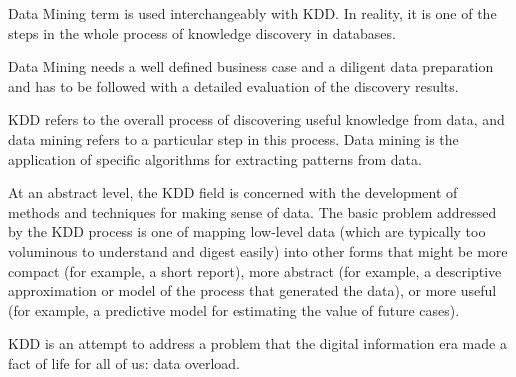 Data Mining term is used interchangeably with KDD. In reality, it is one of the steps in the whole process of knowledge discovery in databases.


Data Mining needs a well defined business case and a diligent data preparation and has to be followed with a detailed evaluation of the discovery results.


KDD refers to the overall process of discovering useful knowledge from data, and data mining refers to a particular step in this process. Data mining is the application of specific algorithms for extracting patterns from data.


At an abstract level, the KDD field is concerned with the development of methods and techniques for making sense of data. The basic problem addressed by the KDD process is one of mapping low-level data (which are typically too voluminous to understand and digest easily) into other forms that might be more compact (for example, a short report), more abstract (for example, a descriptive approximation or model of the process that generated the data), or more useful (for example, a predictive model for estimating the value of future cases).


KDD is an attempt to address a problem that the digital information era made a fact of life for all of us: data overload.


